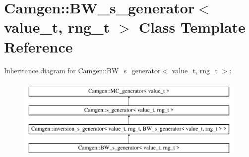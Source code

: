 \hypertarget{a00033}{\section{Camgen\-:\-:B\-W\-\_\-s\-\_\-generator$<$ value\-\_\-t, rng\-\_\-t $>$ Class Template Reference}
\label{a00033}
}
Inheritance diagram for Camgen\-:\-:B\-W\-\_\-s\-\_\-generator$<$ value\-\_\-t, rng\-\_\-t $>$\-:\begin{figure}[H]
\begin{center}
\leavevmode
\includegraphics[height=4.000000cm]{a00033}
\end{center}
\end{figure}
